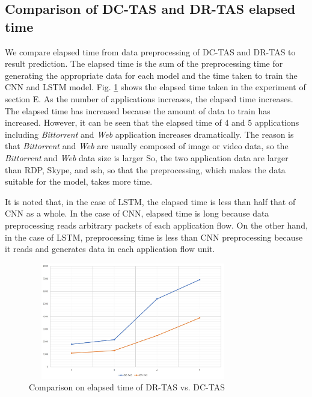 \documentclass[10pt, twoside, jounal]{IEEEtran}
\begin{document}
\subsection{Comparison of DC-TAS and DR-TAS elapsed time}
We compare elapsed time from data preprocessing of DC-TAS and DR-TAS to result prediction.
The elapsed time is the sum of the preprocessing time for generating the appropriate data for each model and the time taken to train the CNN and LSTM model.
Fig. \ref{fig8} shows the elapsed time taken in the experiment of section E.
As the number of applications increases, the elapsed time increases.
The elapsed time has increased because the amount of data to train has increased.
However, it can be seen that the elapsed time of 4 and 5 applications including {\it Bittorrent} and {\it Web} application increases
dramatically.
The reason is that {\it Bittorrent} and {\it Web} are usually composed of image or video data, so the {\it Bittorrent} and {\it Web} data size is larger
So, the two application data are larger than RDP, Skype, and ssh, so that the preprocessing, which makes the data suitable for the model, takes more time.

It is noted that, in the case of LSTM, the elapsed time is less than half that of CNN as a whole.
In the case of CNN, elapsed time is long because data preprocessing reads arbitrary packets of each application flow.
On the other hand, in the case of LSTM, preprocessing time is less than CNN preprocessing because it reads and generates data in each application flow unit.

\begin{figure}[!t]
\centering
\setlength{\abovecaptionskip}{0pt}
\setlength{\belowcaptionskip}{0pt}
{
\includegraphics[width=3.6in, height=2.0in]{fig8.jpg}
\caption{Comparison on elapsed time of DR-TAS vs. DC-TAS}
\label{fig8}
}
\end{figure}


\end{document}
